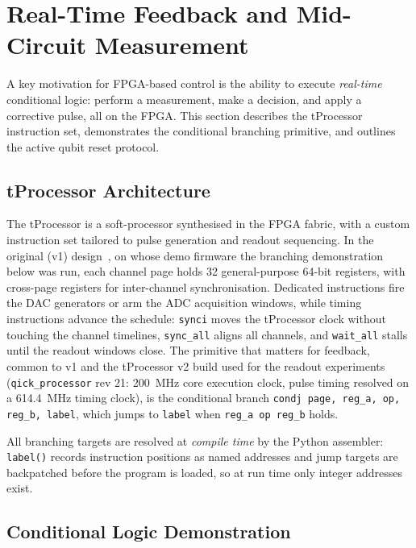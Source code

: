 \section{Real-Time Feedback and Mid-Circuit Measurement}
\label{sec:feedback}

A key motivation for FPGA-based control is the ability to execute
\emph{real-time} conditional logic: perform a measurement, make a decision, and
apply a corrective pulse, all on the FPGA.
This section describes the tProcessor instruction set, demonstrates the
conditional branching primitive, and outlines the active qubit reset protocol.

\subsection{tProcessor Architecture}
\label{subsec:tproc_arch}

The tProcessor is a soft-processor synthesised in the FPGA fabric, with a
custom instruction set tailored to pulse generation and readout sequencing.  In
the original (v1) design~\cite{Stefanazzi2022}, on whose demo firmware the
branching demonstration below was run, each
channel page holds 32 general-purpose 64-bit registers, with cross-page registers
for inter-channel synchronisation.  Dedicated instructions fire the DAC generators
or arm the ADC acquisition windows, while timing instructions advance the schedule:
\texttt{synci} moves the tProcessor clock without touching the channel timelines,
\texttt{sync\_all} aligns all channels, and \texttt{wait\_all} stalls until the
readout windows close.  The primitive that matters for feedback, common to v1 and
the tProcessor v2 build used for the readout experiments
(\texttt{qick\_processor} rev 21: \SI{200}{\mega\hertz} core execution clock,
pulse timing resolved on a \SI{614.4}{\mega\hertz} timing clock), is the conditional
branch \texttt{condj page, reg\_a, op, reg\_b, label}, which jumps to \texttt{label}
when \texttt{reg\_a op reg\_b} holds.

All branching targets are resolved at \emph{compile time} by the Python
assembler: \texttt{label()} records instruction positions as named addresses and
jump targets are backpatched before the program is loaded, so at run time only
integer addresses exist.

\subsection{Conditional Logic Demonstration}
\label{subsec:cond_logic}

